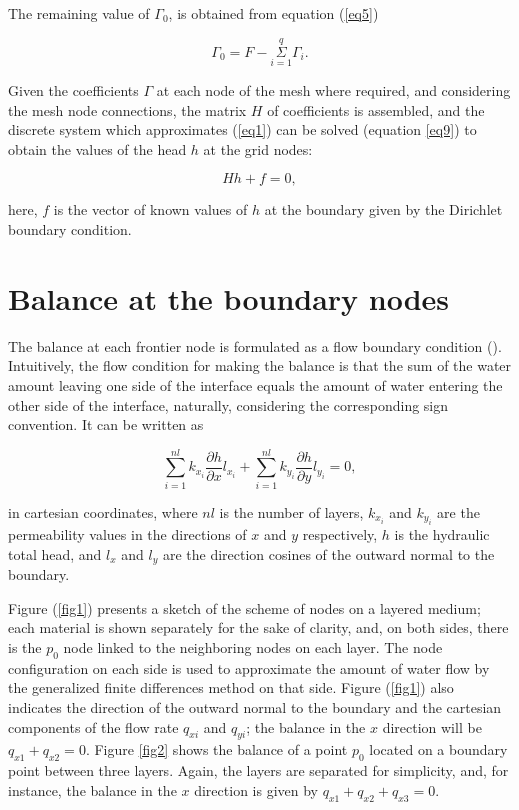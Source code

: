 \documentclass[a4paper,fleqn]{cas-sc}
\begin{document}
The remaining value of $\Gamma_0$, is obtained from equation (\ref{eq5})

\begin{equation}
\Gamma _0=F-\underset{i=1}{\overset{q}{\Sigma }}\Gamma _i.
\end{equation}

Given the coefficients $\Gamma$ at each node of the mesh where required, and considering the mesh node connections, the matrix $H$ of coefficients is assembled, and the  discrete system which approximates (\ref{eq1}) can be solved (equation \ref{eq9}) to obtain the values of the head $h$ at the grid nodes: 

\begin{equation}\label{eq9}
H h+f=0,
\end{equation}


here, $f$ is the vector of known values of $h$ at the boundary given by the Dirichlet boundary condition.

\section{Balance at the boundary nodes}\label{sec3}

The balance at each frontier node is formulated as a flow boundary condition (\cite{desai2013advanced}). Intuitively, the flow condition for making the balance is that the sum of the water amount leaving one side of the interface equals the amount of water entering the other side of the interface, naturally, considering the corresponding sign convention. It can be written as    
 
\begin{equation}
\sum_{i=1}^{nl} k_{x_i} \frac{\partial h}{\partial x} l_{x_i}+
\sum_{i=1}^{nl} k_{y_i} \frac{\partial h}{\partial y} l_{y_i}=0,
\label{eq10}
\end{equation}

in cartesian coordinates, where $nl$ is the number of layers, $k_{x_i}$ and $k_{y_i}$ are the permeability values in the directions of $x$ and $y$ respectively, $h$ is the hydraulic total head, and $l_x$ and $l_y$ are the direction cosines of the outward normal to the boundary.  

Figure (\ref{fig1}) presents a sketch of the scheme of nodes on a layered medium; each material is shown separately for the sake of clarity, and, on both sides, there is the $p_0$ node linked to the neighboring nodes on each layer. The node configuration on each side is used to approximate the amount of water flow by the generalized finite differences method on that side. Figure (\ref{fig1}) also indicates the direction of the outward normal to the boundary and the cartesian components of the flow rate $q_{xi}$ and $q_{yi}$; the balance in the $x$ direction will be $ q_{x1}+q_{x2}=0$. Figure \ref{fig2} shows the balance of a point $p_0$ located on a boundary point between three layers. Again, the layers are separated for simplicity, and, for instance, the balance in the $x$ direction is given by $ q_{x1}+ q_{x2}+ q_{x3}=0$.
\end{document}
